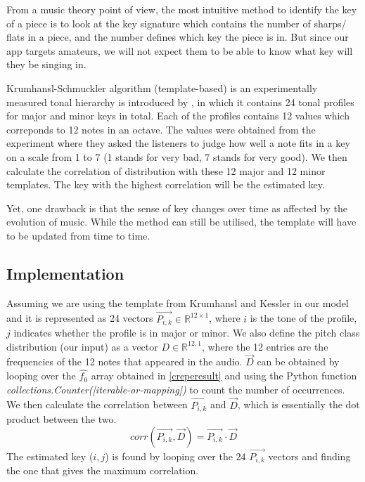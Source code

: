 From a music theory point of view, the most intuitive method to identify the key of a piece is to look at the key signature which contains the number of sharps/ flats
in a piece, and the number defines which key the piece is in. But since our app targets amateurs, we will not expect them to be able to know what key will they be singing
in.

Krumhansl-Schmuckler algorithm (template-based)  is an experimentally measured tonal hierarchy is introduced by \cite{templatedata}, in which it contains 
24 tonal profiles for major and minor keys in total.
Each of the profiles contains 12 values which correponds to 12 notes in an octave. The values were obtained from the experiment where they asked the listeners to judge how well
a note fits in a key on a scale from 1 to 7 (1 stands for very bad, 7 stands for very good). We then calculate the correlation of distribution with these 12 major and 12 minor
templates. The key with the highest correlation will be the estimated key.

Yet, one drawback is that the sense of key changes over time as affected by the evolution of music. While the method can still be utilised, the template will have to be
updated from time to time.

\subsection{Implementation}
Assuming we are using the template from Krumhansl and Kessler in our model and it is represented as 24 vectors $\vec{P_{i,k}} \in \mathbb{R}^{12 \times 1}$, 
where $i$ is the tone of the profile, $j$ indicates whether the profile is in major or minor.
We also define the pitch class distribution (our input) as a vector $D \in \mathbb{R}^{12,1}$, where the 12 entries are the frequencies of the 12 notes that appeared in the audio.
$\vec{D}$ can be obtained by looping over the $\hat{f_0}$ array obtained in \autoref{creperesult} and using the Python function \emph{collections.Counter([iterable-or-mapping])} to count the
number of occurrences. We then calculate the correlation between $\vec{P_{i,k}}$ and $\vec{D}$, which is essentially the dot product between the two.
\[ corr(\vec{P_{i,k}},\vec{D}) = \vec{P_{i,k}} \cdot \vec{D} \]
The estimated key ($i,j$) is found by looping over the 24 $\vec{P_{i,k}}$ vectors and finding the one that gives the maximum correlation.